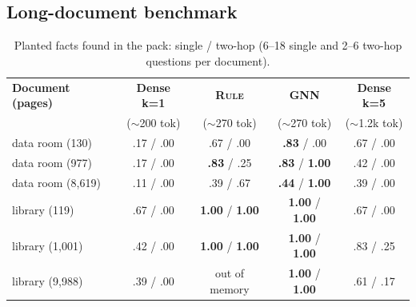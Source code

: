 \documentclass[11pt]{article}
\newcommand{\rulepipe}{\textsc{Rule}}
\begin{document}
\subsection{Long-document benchmark}
\label{sec:longbench}

\begin{table}[t]
\centering
\scriptsize
\setlength{\tabcolsep}{2.5pt}
\begin{tabular}{@{}lcccc@{}}
\toprule
\textbf{Document (pages)} & \textbf{Dense k=1} & \textbf{\rulepipe{}} & \textbf{GNN} & \textbf{Dense k=5} \\
 & ($\sim$200 tok) & ($\sim$270 tok) & ($\sim$270 tok) & ($\sim$1.2k tok) \\
\midrule
data room (130) & .17 / .00 & .67 / .00 & \textbf{.83} / .00 & .67 / .00 \\
data room (977) & .17 / .00 & \textbf{.83} / .25 & \textbf{.83} / \textbf{1.00} & .42 / .00 \\
data room (8,619) & .11 / .00 & .39 / .67 & \textbf{.44} / \textbf{1.00} & .39 / .00 \\
library (119) & .67 / .00 & \textbf{1.00} / \textbf{1.00} & \textbf{1.00} / \textbf{1.00} & .67 / .00 \\
library (1,001) & .42 / .00 & \textbf{1.00} / \textbf{1.00} & \textbf{1.00} / \textbf{1.00} & .83 / .25 \\
library (9,988) & .39 / .00 & out of memory & \textbf{1.00} / \textbf{1.00} & .61 / .17 \\
\bottomrule
\end{tabular}
\caption{Planted facts found in the pack: single / two-hop (6--18 single and 2--6 two-hop questions per document).}
\label{tab:longbench}
\end{table}
\end{document}
